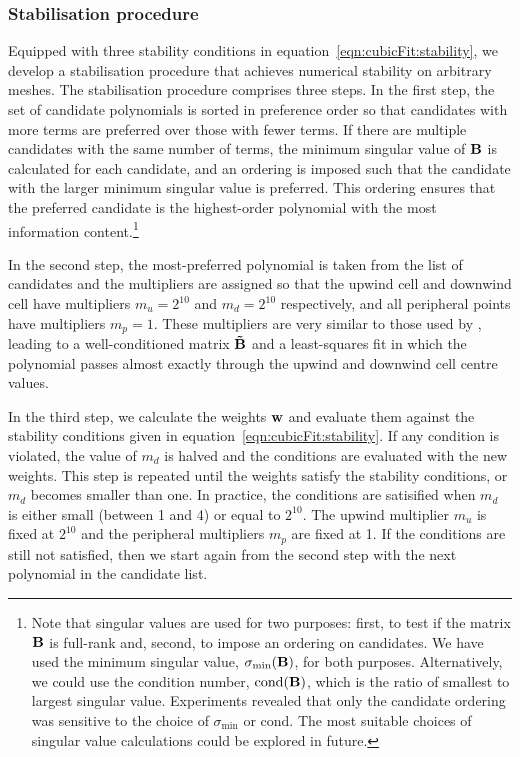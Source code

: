 \subsubsection{Stabilisation procedure}

Equipped with three stability conditions in equation~\ref{eqn:cubicFit:stability}, we develop a stabilisation procedure that achieves numerical stability on arbitrary meshes.
The stabilisation procedure comprises three steps.  In the first step, the set of candidate polynomials is sorted in preference order so that candidates with more terms are preferred over those with fewer terms.
If there are multiple candidates with the same number of terms, the minimum singular value of $\mathbf{B}$ is calculated for each candidate, and an ordering is imposed such that the candidate with the larger minimum singular value is preferred.  This ordering ensures that the preferred candidate is the highest-order polynomial with the most information content.\footnote{Note that singular values are used for two purposes: first, to test if the matrix $\mathbf{B}$ is full-rank and, second, to impose an ordering on candidates.
We have used the minimum singular value, $\sigma_\mathrm{min}(\mathbf{B})$, for both purposes.  Alternatively, we could use the condition number, $\mathrm{cond}(\mathbf{B})$, which is the ratio of smallest to largest singular value.
Experiments revealed that only the candidate ordering was sensitive to the choice of $\sigma_\mathrm{min}$ or $\mathrm{cond}$.
The most suitable choices of singular value calculations could be explored in future.}

In the second step, the most-preferred polynomial is taken from the list of candidates and the multipliers are assigned so that the upwind cell and downwind cell have multipliers $m_u = 2^{10}$ and $m_d = 2^{10}$ respectively, and all peripheral points have multipliers $m_p = 1$.  These multipliers are very similar to those used by \citet{lashley2002}, leading to a well-conditioned matrix $\mathbf{\tilde{B}}$ and a least-squares fit in which the polynomial passes almost exactly through the upwind and downwind cell centre values.

In the third step, we calculate the weights $\mathbf{w}$ and evaluate them against the stability conditions given in equation~\eqref{eqn:cubicFit:stability}.
If any condition is violated, the value of $m_d$ is halved and the conditions are evaluated with the new weights.  This step is repeated until the weights satisfy the stability conditions, or $m_d$ becomes smaller than one.  In practice, the conditions are satisified when $m_d$ is either small (between 1 and 4) or equal to $2^{10}$.  The upwind multiplier $m_u$ is fixed at $2^{10}$ and the peripheral multipliers $m_p$ are fixed at \num{1}.  If the conditions are still not satisfied, then we start again from the second step with the next polynomial in the candidate list. 

